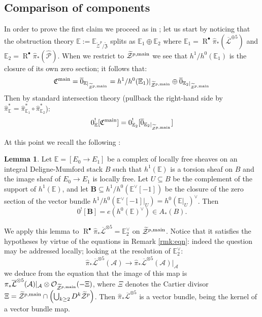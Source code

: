 \documentclass[11pt]{amsart}
\newcommand{\pazocal}{\mathcal}
\newcommand{\tZ}{\widetilde{\pazocal Z}}
\newcommand{\tZp}{\widetilde{\pazocal Z}^p}
\newcommand{\tXP}{\widetilde{\mathfrak Z}}
\newcommand{\OO}{\mathcal{O}}
\renewcommand{\to}{\rightarrow}
\newcommand{\A}{\mathcal A}
\newcommand{\R}{\operatorname{R}^{\bullet}}
\newcommand{\hL}{\overline{\mathcal{L}}}
\theoremstyle{definition}
\newtheorem{lem}[thm]{Lemma}
\theoremstyle{definition}
\begin{document}
\subsection{Comparison of components}
In order to prove the first claim we proceed as in \cite[\S5]{CLpfields}; let us start by noticing that the obstruction theory $\mathbb E:=\mathbb E_{\tZp/\tXP}$ splits as $\mathbb E_1\oplus\mathbb E_2$ where $\mathbb E_1=\R\hat\pi_*(\hL^{\oplus 5})$ and $\mathbb E_2=\R\hat\pi_*(\widehat{\mathcal P})$. When we restrict to $\tZ^{p,\rm{main}}$ we see that $h^1/h^0(\mathbb E_1)$ is the closure of its own zero section; it follows that:
\[
 \mathfrak C^{\rm{main}}=\overline{0}_{\mathbb E\rvert_{\tZ^{p,\rm{main}}}}=h^1/h^0(\mathbb E_1)\rvert_{\tZ^{p,\rm{main}}}\oplus \overline{0}_{\mathbb E_2\rvert_{\tZ^{p,\rm{main}}}}
\]
Then by standard intersection theory (pullback the right-hand side by $\hat\pi_{\mathbb E}^*=\hat\pi_{\mathbb E_1}^*\circ\hat\pi_{\mathbb E_2}^*$):
\[
 0^!_{\mathbb E}[\mathfrak C^{\rm{main}}]=0_{\mathbb E_2}^![\overline{0}_{\mathbb E_2\rvert_{\tZ^{p,\rm{main}}}}]
\]

At this point we recall the following \cite[Lemma 5.3]{CLpfields}:
\begin{lem}
Let $\mathbb E=[E_0\to E_1]$ be a complex of locally free sheaves on an integral Deligne-Mumford stack $B$ such that
$h^1(\mathbb E)$ is a torsion sheaf on $B$ and the image sheaf of $E_0\to E_1$ is locally free.
Let $U\subseteq B$ be the complement of the support of $h^1(\mathbb E)$, and let $\mathbf{B}\subseteq h^1/h^0(\mathbb E^\vee[-1])$
be the closure of the zero section  of the vector bundle $h^1/h^0(\mathbb E^\vee[-1]|_U)= h^0(\mathbb E|_U)^\vee$. Then
$$0^![\mathbf{B}]=e(h^0(\mathbb E)^\vee)\in A_*(B).
$$
\end{lem}

We apply this lemma to $\R\hat{\pi}_*\hL^{\otimes 5}=\mathbb E_2^\vee$ on $\tZ^{p,\rm{main}}$. Notice that it satisfies the hypotheses by virtue of the equations in Remark \ref{rmk:eqn}: indeed the question may be addressed locally; looking at the resolution of $\mathbb E_2^\vee$:
\[
 \hat\pi_*\hL^{\otimes 5}(\A)\to \hat\pi_*\hL^{\otimes 5}(\A)\rvert_{\A}
\]
we deduce from the equation that the image of this map is $\pi_*\hL^{\otimes 5}(\A)\rvert_{\A}\otimes\OO_{\tZ^{p,\rm{main}}}(-\Xi)$, where $\Xi$ denotes the Cartier divisor $\Xi=\tZ^{p,\rm{main}}\cap\left(\bigcup_{k\geq 2}D^k\tZp\right)$. Then $\hat\pi_*\hL^{\otimes 5}$ is a vector bundle, being the kernel of a vector bundle map.
\end{document}
